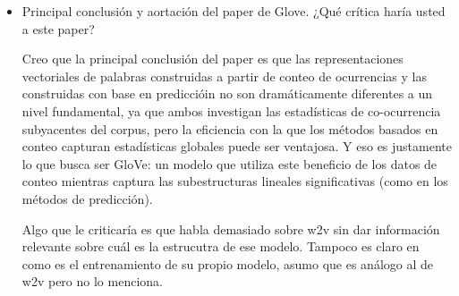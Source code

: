 \documentclass[letter, 11pt, twoside]{report}
\begin{document}
\begin{itemize}
  \item Principal conclusión y aortación del paper de Glove. ¿Qué crítica haría usted a este paper?
  

  Creo que la principal conclusión del paper es que 
  las representaciones vectoriales de palabras construidas a partir de conteo de ocurrencias y las construidas con base en prediccióin no son dramáticamente diferentes a un nivel fundamental, ya que ambos investigan las estadísticas de co-ocurrencia subyacentes del corpus, pero la eficiencia con la que los métodos basados en conteo capturan estadísticas globales puede ser ventajosa. Y eso es justamente lo que busca ser GloVe: un modelo que utiliza este beneficio de los datos de conteo mientras captura las subestructuras lineales significativas (como en los métodos de predicción).

  Algo que le criticaría es que habla demasiado sobre w2v sin dar información relevante sobre cuál es la estrucutra de ese modelo. Tampoco es claro en como es el entrenamiento de su propio modelo, asumo que es análogo al de w2v pero no lo menciona.

\end{itemize}

\end{document}
